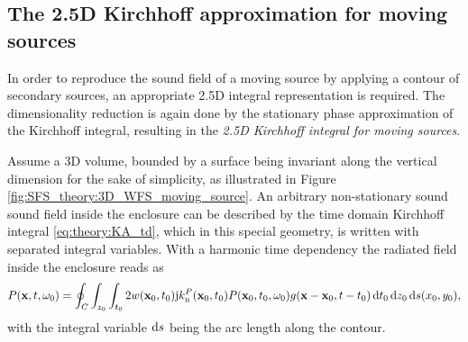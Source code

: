 \subsection{The 2.5D Kirchhoff approximation for moving sources}

In order to reproduce the sound field of a moving source by applying a contour of secondary sources, an appropriate 2.5D integral representation is required.
The dimensionality reduction is again done by the stationary phase approximation of the Kirchhoff integral, resulting in the \emph{2.5D Kirchhoff integral for moving sources}.

Assume a 3D volume, bounded by a surface being invariant along the vertical dimension for the sake of simplicity, as illustrated in Figure \ref{fig:SFS_theory:3D_WFS_moving_source}.
An arbitrary non-stationary sound sound field inside the enclosure can be described by the time domain Kirchhoff integral \eqref{eq:theory:KA_td}, which in this special geometry, is written with separated integral variables.
With a harmonic time dependency the radiated field inside the enclosure reads as
\begin{equation}
\small
P(\mathbf{x},t,\omega_0) = 
\oint_{C} \int_{z_0} \int_{t_0}
2 w(\mathbf{x}_0,t_0) \mathrm{j} k_{\mathrm{n}}^P(\mathbf{x}_0,t_0) 	
P(\mathbf{x}_0,t_0,\omega_0) g(\mathbf{x}-\mathbf{x}_0,t-t_0) \, \mathrm{d} t_0 \, \mathrm{d} z_0 \, \mathrm{d} s(x_0, y_0),
\label{Eq:SFS_theory:Kirchhoff_spec_geom_td}
\end{equation}
with the integral variable $\mathrm{d} s$ being the arc length along the contour.
%

